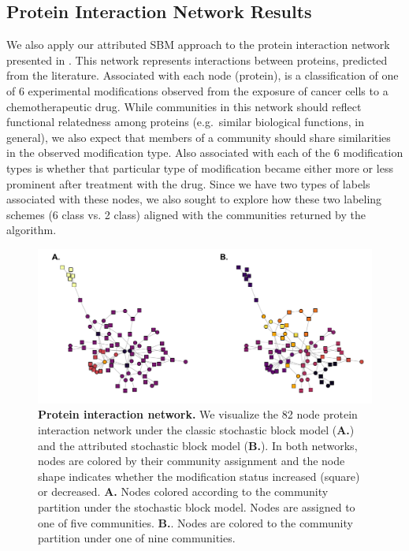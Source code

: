 \subsection{Protein Interaction Network Results}
We also apply our attributed SBM approach to the protein interaction network presented in \cite{bonacci}. This network represents interactions between proteins, predicted from the literature. Associated with each node (protein), is a classification of one of 6 experimental modifications observed from the exposure of cancer cells to a chemotherapeutic drug. While communities in this network should reflect functional relatedness among proteins (e.g.\ similar biological functions, in general), we also expect that members of a community should share similarities in the observed modification type. Also associated with each of the 6 modification types is whether that particular type of modification became either more or less prominent after treatment with the drug. Since we have two types of labels associated with these nodes, we also sought to explore how these two labeling schemes (6 class vs. 2 class) aligned with the communities returned by the algorithm. 

\begin{figure}[h!]
\begin{center}
\includegraphics[width=1\textwidth]{ProteinNet_Dec12.pdf}
\caption{{\bf Protein interaction network.} We visualize the 82 node protein interaction network under the classic stochastic block model ({\bf A.}) and the attributed stochastic block model ({\bf B.}). In both networks, nodes are colored by their community assignment and the node shape indicates whether the modification status increased (square) or decreased. {\bf A.} Nodes colored according to the community partition under the stochastic block model. Nodes are assigned to one of five communities. {\bf B.}. Nodes are colored to the community partition under one of nine communities.}
\label{Fig7}
\end{center}
\end{figure}

